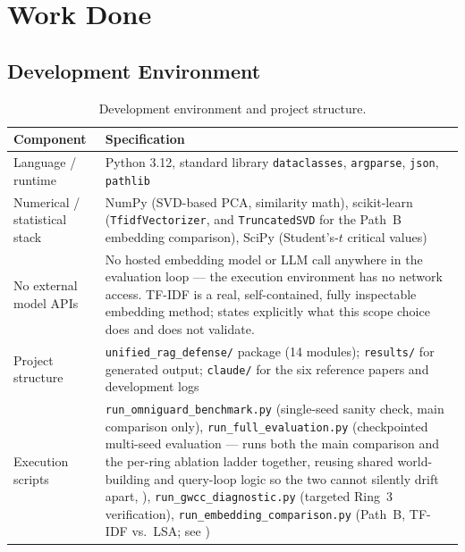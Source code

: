 \section{Work Done}
\label{sec:workdone}

\subsection{Development Environment}
\label{sec:devenv}

\begin{table}[htbp]
\centering
\small
\begin{tabularx}{\textwidth}{@{}l Y@{}}
\toprule
\textbf{Component} & \textbf{Specification} \\
\midrule
Language / runtime & Python 3.12, standard library \texttt{dataclasses}, \texttt{argparse}, \texttt{json}, \texttt{pathlib} \\
Numerical / statistical stack & NumPy (SVD-based PCA, similarity math), scikit-learn (\texttt{TfidfVectorizer}, and \texttt{TruncatedSVD} for the Path~B embedding comparison), SciPy (Student's-$t$ critical values) \\
No external model APIs & No hosted embedding model or LLM call anywhere in the evaluation loop --- the execution environment has no network access. TF-IDF is a real, self-contained, fully inspectable embedding method;  states explicitly what this scope choice does and does not validate. \\
Project structure & \texttt{unified\_rag\_defense/} package (14 modules); \texttt{results/} for generated output; \texttt{claude/} for the six reference papers and development logs \\
Execution scripts & \texttt{run\_omniguard\_benchmark.py} (single-seed sanity check, main comparison only), \texttt{run\_full\_evaluation.py} (checkpointed multi-seed evaluation --- runs both the main comparison and the per-ring ablation ladder together, reusing shared world-building and query-loop logic so the two cannot silently drift apart, ), \texttt{run\_gwcc\_diagnostic.py} (targeted Ring~3 verification), \texttt{run\_embedding\_comparison.py} (Path~B, TF-IDF vs.\ LSA; see ) \\
\bottomrule
\end{tabularx}
\caption{Development environment and project structure.}
\label{tab:devenv}
\end{table}

